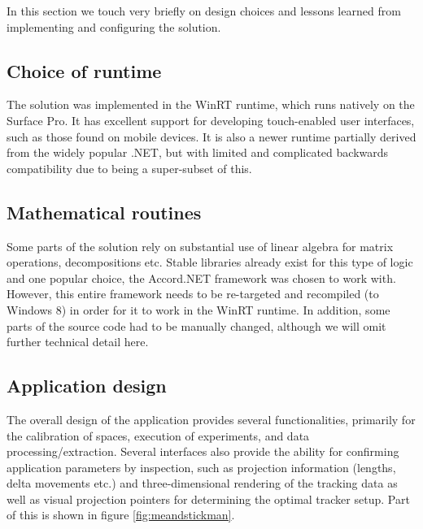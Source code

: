 \noi In this section we touch very briefly on design choices  and  lessons learned  from implementing and configuring the solution.\\

\subsection{Choice of runtime}

The solution was implemented in the WinRT runtime, which runs natively on the Surface Pro. It has excellent support for developing touch-enabled user interfaces, such as those found on mobile devices. It is also a newer runtime partially derived from the widely popular .NET, but with limited and complicated backwards compatibility due to being a super-subset of this.

\subsection{Mathematical routines}

Some parts of the solution rely on substantial use of linear algebra for matrix operations, decompositions etc. Stable libraries already exist for this type of logic and one popular choice, the Accord.NET framework was chosen to work with. However, this entire framework needs to be re-targeted and recompiled (to Windows 8) in order for it to work in the WinRT runtime. In addition, some parts of the source code had to be manually changed, although we will omit further technical detail here.


%

\subsection{Application design}

The overall design of the application provides several functionalities, primarily for the calibration of spaces, execution of experiments, and data processing/extraction. Several interfaces also provide the ability for confirming application parameters  by inspection, such as projection information (lengths, delta movements etc.) and three-dimensional rendering of the tracking data as well as visual projection pointers for determining the optimal tracker setup. Part of this is shown in figure \ref{fig:meandstickman}.

